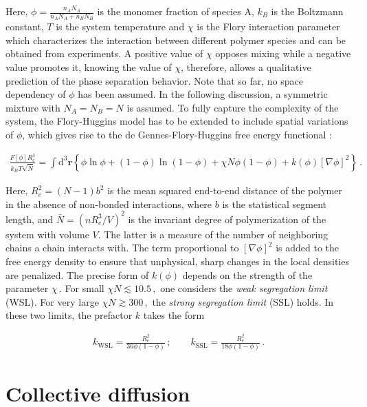 \documentclass[bachelor,       %
               twoside,        %
               BCOR10mm,       %
                ngerman,english  %
               ]{GAUBM}
\begin{document}
Here, $\phi=\frac{n_AN_A}{n_AN_A+n_BN_B}$ is the monomer fraction of species A, $k_B$ is the Boltzmann constant, $T$ is the system temperature and $\chi$ is the Flory interaction parameter which characterizes the interaction between different polymer species and can be obtained from experiments. A positive value of $\chi$ opposes mixing while a negative value promotes it, knowing the value of $\chi$, therefore, allows a qualitative prediction of the phase separation behavior. Note that so far, no space dependency of $\phi$ has been assumed. In the following discussion, a symmetric mixture with $N_A=N_B=N$ is assumed. To fully capture the complexity of the system, the Flory-Huggins model has to be extended to include spatial variations of $\phi$, which gives rise to the de Gennes-Flory-Huggins free energy functional  \cite{deGennes80, Reister02}:


\begin{align}
  \frac{F[\phi]R_e^3}{k_BT\sqrt{\bar N}}=\int \mathrm{d}^3\mathbf{r}\left\{\phi\ln\phi+(1-\phi)\ln(1-\phi)+\chi N\phi(1-\phi)+k(\phi)[\nabla\phi]^2\right\}\,.
  \label{eq:flory_fctl}
\end{align}

Here, $R_e^2=(N-1)b^2$ is the mean squared end-to-end distance of the polymer in the absence of non-bonded interactions, where $b$ is the statistical segment length, and $\bar N=\left(nR_e^3/V\right)^2$ is the invariant degree of polymerization of the system with volume $V$. The latter is a measure of the number of neighboring chains a chain interacts with. The term proportional to $[\nabla\phi]^2$ is added to the free energy density to ensure that unphysical, sharp changes in the local densities are penalized. The precise form of $k(\phi)$ depends on the strength of the parameter $\chi\,$. For small $\chi N\lesssim 10.5\,,$ one considers the \textit{weak segregation limit} (WSL). For very large $\chi N\gtrsim300\,,$ the \textit{strong segregation limit} (SSL) holds. In these two limits, the prefactor $k$ takes the form \cite{Reister02}

\begin{align}
  k_\mathrm{WSL}=\frac{R_e^2}{36\phi(1-\phi)}\,;\qquad k_\mathrm{SSL}=\frac{R_e^2}{18\phi(1-\phi)}\,.
\end{align}


\section{Collective diffusion}
\end{document}
